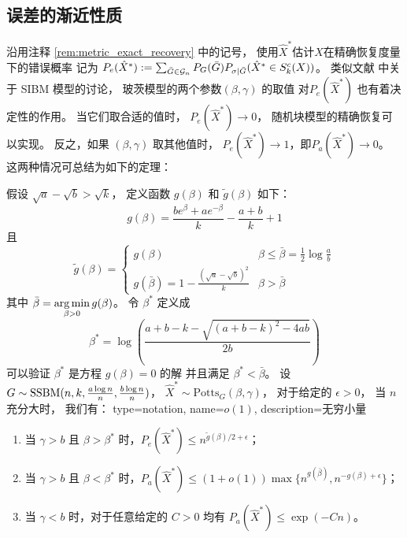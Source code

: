\subsection{误差的渐近性质}
沿用注释 \ref{rem:metric_exact_recovery} 中的记号，
使用$\hat{X}^*$估计$X$在精确恢复度量下的错误概率
记为 $P_e(\hat{X}^*) := \sum_{\bar{G} \in \mathcal{G}_n}
P_G(\bar{G}) P_{\sigma | \bar{G}}(\hat{X}^* \in S^c_k(X))$。
类似文献  中关于 SIBM 模型的讨论，
玻茨模型的两个参数$(\beta, \gamma)$ 的取值
对$P_e(\hat{X}^*)$
也有着决定性的作用。
当它们取合适的值时， 
$ P_e(\hat{X}^*)\to 0$，
随机块模型的精确恢复可以实现。
反之，如果 $(\beta, \gamma)$ 取其他值时，
$P_e(\hat{X}^*) \to 1$，即$P_a(\hat{X}^*) \to 0$。
这两种情况可总结为如下的定理：

\begin{theorem}\label{thm:phase_transition}
	假设 $\sqrt{a} - \sqrt{b} > \sqrt{k}$，
	定义函数 $g(\beta)$ 和 $ \tilde{g}(\beta)$ 如下：
	\begin{equation}
		\label{eq:g_beta_main_article}
		g(\beta) = \frac{be^{\beta} + a e^{-\beta}}{k} - \frac{a+b}{k} +1
	\end{equation}
	且
	\begin{equation}
		\label{eq:g_tilde_beta_main_article}
	\tilde{g}(\beta) = \begin{cases}
	g(\beta) & \beta \leq \bar{\beta} = \frac{1}{2}\log \frac{a}{b} \\
	g(\bar{\beta}) = 1 - \frac{\left(\sqrt{a} - \sqrt{b}\right)^2}{k} & \beta > \bar{\beta}
	\end{cases}
	\end{equation}
	其中
	$\bar{\beta} =  \displaystyle\operatorname*{arg\,min}_{\beta > 0} g(\beta)$。
	令 $\beta^*$ 定义成
	\begin{equation}\label{eq:beta_star}
	\beta^* = \log\left(\frac{a + b - k - \sqrt{(a + b - k)^2 - 4 a b}}{2  b}\right)
	\end{equation}
	可以验证 $\beta^*$ 是方程 $g(\beta) = 0$ 的解 并且满足  $\beta^* < \bar{\beta}$。	
	设 $G\sim \operatorname{SSBM}(n, k, \frac{a \log n}{n}, \frac{b \log n}{n})$， $\hat{X}^* \sim \textrm{Potts}_G(\beta, \gamma)$，
	对于给定的 $\epsilon > 0$， 当 $n$ 充分大时， 我们有：
	{
	  type=notation,
	  name={$o(1)$},
	  description={无穷小量}
	}
	\begin{enumerate}
	\item 当 $\gamma > b$ 且 $\beta > \beta^*$ 时，$P_e(\hat{X}^*) \leq n^{\tilde{g}(\beta)/2 + \epsilon}$；
	\item 当 $\gamma > b$ 且 $\beta < \beta^*$ 时，$P_a(\hat{X}^*) \leq (1+o(1))\max\{n^{g(\bar{\beta})}, n^{-g(\beta) + \epsilon}\}$；
	\item 当 $\gamma < b$ 时，对于任意给定的 $C>0$	均有 $P_a(\hat{X}^*) \leq \exp(-C n)$。
	\end{enumerate}
\end{theorem}

